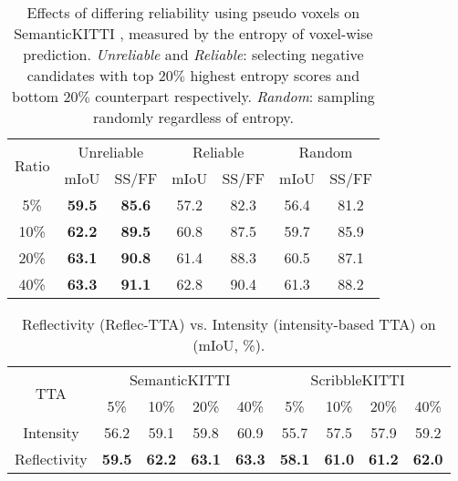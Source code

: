 \documentclass[10pt,twocolumn,letterpaper]{article}
\begin{document}
 \begin{table}[H]
    \scriptsize
    \vspace{-3pt}
    \setlength{\abovecaptionskip}{0.05cm}
    \centering
\caption{Effects of differing reliability using pseudo voxels on SemanticKITTI {\validset}, measured by the entropy of voxel-wise prediction. \textit{Unreliable} and \textit{Reliable}: selecting negative candidates with top $20 \%$ highest entropy scores and bottom $20 \%$ counterpart respectively. \textit{Random}: sampling randomly regardless of entropy.
}
{
\begin{tabular}{c|cc|cc|cc}
\toprule 
 \multirow{2}{*}{Ratio} & \multicolumn{2}{c|}{Unreliable} & \multicolumn{2}{c|}{Reliable} & \multicolumn{2}{c}{Random} \\
 & mIoU & SS/FF & mIoU & SS/FF & mIoU & SS/FF \\
\midrule 
 5\% & \textbf{59.5} & \textbf{85.6} & 57.2 & 82.3 & 56.4 & 81.2 \\
10\% & \textbf{62.2} & \textbf{89.5} & 60.8 & 87.5 & 59.7 & 85.9 \\
20\% & \textbf{63.1} & \textbf{90.8} & 61.4 & 88.3 & 60.5 & 87.1 \\
40\% & \textbf{63.3} & \textbf{91.1} & 62.8 & 90.4 & 61.3 & 88.2 \\
 \bottomrule
\end{tabular}
\label{tab:pseudo}
}
\vspace{-10pt}
\end{table} \begin{table}[!h]
    \scriptsize
    \vspace{-3pt}
    \centering
    \setlength{\abovecaptionskip}{0.05cm}
    \caption{Reflectivity (Reflec-TTA) vs. Intensity (intensity-based TTA) on  {\validset} (mIoU, \%).}
{\begin{tabular}{c|cccc|cccc}
\toprule
\multirow{2}{*}{TTA} & \multicolumn{4}{c|}{SemanticKITTI~\cite{behley2019semantickittia}} & \multicolumn{4}{c}{ScribbleKITTI~\cite{Unal_2022_CVPR}} \\
& 5\% & 10\% & 20\% & 40\% & 5\% & 10\% & 20\% & 40\% \\
\midrule 
Intensity 
& 56.2   & 59.1   & 59.8   & 60.9   & 55.7   & 57.5   & 57.9   & 59.2 \\Reflectivity  & \textbf{59.5}  & \textbf{62.2} & \textbf{63.1} & \textbf{63.3} & \textbf{58.1} & \textbf{61.0}  & \textbf{61.2} & \textbf{62.0} \\
\bottomrule
\end{tabular}}
\label{tab:ref_vs_inten}
\vspace{-10pt}
\end{table}
 
\end{document}
